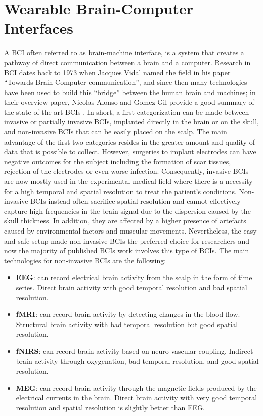 \section{Wearable Brain-Computer Interfaces}
\label{sec:wearable_bci}
A \ac{BCI} often referred to as brain-machine interface, is a system that creates a pathway of direct communication between a brain and a computer. Research in \ac{BCI}  dates back to 1973 when Jacques Vidal named the field in his paper “Towards Brain-Computer communication”, and since then many technologies have been used to build this “bridge” between the human brain and machines; in their overview paper, Nicolas-Alonso and Gomez-Gil provide a good summary of the state-of-the-art \ac{BCIs} \cite{nicolas-alonso_brain_2012}. In short, a first categorization can be made between invasive or partially invasive \ac{BCIs}, implanted directly in the brain or on the skull, and non-invasive \ac{BCIs} that can be easily placed on the scalp. The main advantage of the first two categories resides in the greater amount and quality of data that is possible to collect. However, surgeries to implant electrodes can have negative outcomes for the subject including the formation of scar tissues, rejection of the electrodes or even worse infection. Consequently, invasive \ac{BCIs} are now mostly used in the experimental medical field where there is a necessity for a high temporal and spatial resolution to treat the patient's conditions. Non-invasive \ac{BCIs} instead often sacrifice spatial resolution and cannot effectively capture high frequencies in the brain signal due to the dispersion caused by the skull thickness. In addition, they are affected by a higher presence of artefacts caused by environmental factors and muscular movements. Nevertheless, the easy and safe setup made non-invasive \ac{BCIs} the preferred choice for researchers and now the majority of published \ac{BCIs} work involves this type of \ac{BCIs}. The main technologies for non-invasive \ac{BCIs} are the following:
\begin{itemize}
\item \textbf{\ac{EEG}}: can record electrical brain activity from the scalp in the form of time series. Direct brain activity with good temporal resolution and bad spatial resolution.
\item \textbf{\ac{fMRI}}: can record brain activity by detecting changes in the blood flow. Structural brain activity with bad temporal resolution but good spatial resolution.
\item \textbf{\ac{fNIRS}}: can record brain activity based on neuro-vascular coupling. Indirect brain activity through oxygenation, bad temporal resolution, and good spatial resolution.
\item \textbf{ \ac{MEG}}: can record brain activity through the magnetic fields produced by the electrical currents in the brain. Direct brain activity with very good temporal resolution and spatial resolution is slightly better than EEG.
\end{itemize}
